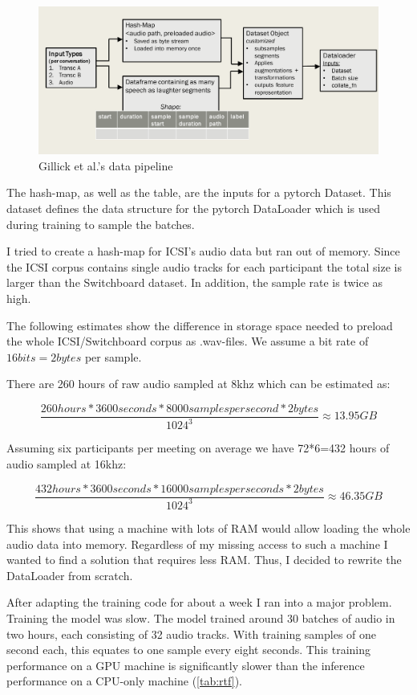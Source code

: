 \documentclass[bsc,frontabs,parskip,deptreport]{infthesis}
\begin{document}
\begin{figure}
    \centering
    \includegraphics[width=14cm]{imgs/diagrams/Gillick_et_al_data_pipeline.png}
    \caption{Gillick et al.'s data pipeline}
    \label{fig:gillick-data-pipeline}
\end{figure}

The hash-map, as well as the table, are the inputs for a pytorch Dataset. This dataset defines the data structure for the pytorch DataLoader which is used during training to sample the batches.

I tried to create a hash-map for ICSI's audio data but ran out of memory. Since the ICSI corpus contains single audio tracks for each participant the total size is larger than the Switchboard dataset. In addition, the sample rate is twice as high.

The following estimates show the difference in storage space needed to preload the whole ICSI/Switchboard corpus as .wav-files. We assume a bit rate of $16bits=2bytes$ per sample.

There are 260 hours of raw audio sampled at 8khz which can be estimated as:

\[ \frac{260hours * 3600 seconds * 8000 samples per second * 2 bytes}{1024^3} \approx 13.95 GB \]

Assuming six participants per meeting on average we have 72*6=432 hours of audio sampled at 16khz:

\[ \frac{432 hours * 3600 seconds * 16000 samples per seconds * 2bytes}{1024^3} \approx 46.35 GB \]

This shows that using a machine with lots of RAM would allow loading the whole audio data into memory. 
Regardless of my missing access to such a machine I wanted to find a solution that requires less RAM. Thus, I decided to rewrite the DataLoader from scratch. 

After adapting the training code for about a week I ran into a major problem. Training the model was slow. The model trained around 30 batches of audio in two hours, each consisting of 32 audio tracks. 
With training samples of one second each, this equates to one sample every eight seconds.
This training performance on a GPU machine is significantly slower than the inference performance on a CPU-only machine (\autoref{tab:rtf}).
\end{document}
